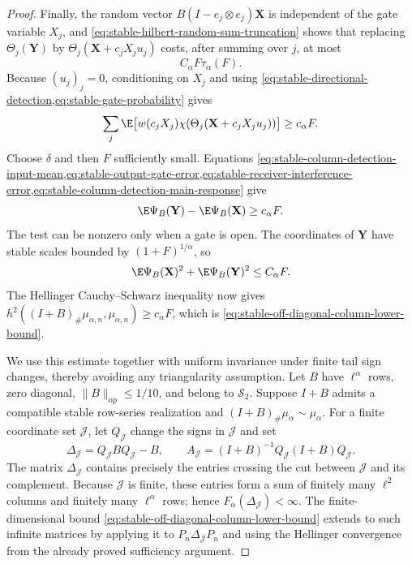\begin{proof}
Finally, the random vector
\(B(I-e_j\otimes e_j)\mathbf X\) is independent of the gate variable \(X_j\),
and \eqref{eq:stable-hilbert-random-sum-truncation} shows that replacing
\(\Theta_j(\mathbf Y)\) by
\(\Theta_j(\mathbf X+c_jX_ju_j)\) costs, after summing over \(j\), at most
\begin{equation}
 C_\alpha F\tau_\alpha(F).
 \label{eq:stable-receiver-interference-error}
\end{equation}
Because \((u_j)_j=0\), conditioning on \(X_j\) and using
\cref{eq:stable-directional-detection,eq:stable-gate-probability} gives
\begin{equation}
 \sum_j\E\bigl[
   w(c_jX_j)\chi(\Theta_j(\mathbf X+c_jX_ju_j))\bigr]
 \ge c_\alpha F.
 \label{eq:stable-column-detection-main-response}
\end{equation}
Choose \(\delta\) and then \(F\) sufficiently small.
Equations
\cref{eq:stable-column-detection-input-mean,eq:stable-output-gate-error,eq:stable-receiver-interference-error,eq:stable-column-detection-main-response}
give
\[
 \E\Psi_B(\mathbf Y)-\E\Psi_B(\mathbf X)\ge c_\alpha F.
\]
The test can be nonzero only when a gate is open.
The coordinates of \(\mathbf Y\) have stable scales bounded by
\((1+F)^{1/\alpha}\), so
\[
 \E\Psi_B(\mathbf X)^2+\E\Psi_B(\mathbf Y)^2\le C_\alpha F.
\]
The Hellinger Cauchy--Schwarz inequality now gives
\(h^2((I+B)_\#\mu_{\alpha,n},\mu_{\alpha,n})\ge c_\alpha F\),
which is \eqref{eq:stable-off-diagonal-column-lower-bound}.

We use this estimate together with uniform invariance under finite tail sign
changes, thereby avoiding any triangularity assumption.
Let \(B\) have \(\ell^\alpha\) rows, zero diagonal,
\(\|B\|_{\mathrm{op}}\le1/10\), and belong to \(\mathcal S_2\).  Suppose
\(I+B\) admits a compatible stable row-series realization and
\((I+B)_\#\mu_\alpha\sim\mu_\alpha\).
For a finite coordinate set \(\mathcal J\), let \(Q_{\mathcal J}\) change
the signs in \(\mathcal J\)
and set
\[
 \Delta_{\mathcal J}=Q_{\mathcal J}BQ_{\mathcal J}-B,
 \qquad
 A_{\mathcal J}=(I+B)^{-1}Q_{\mathcal J}(I+B)Q_{\mathcal J}.
\]
The matrix \(\Delta_{\mathcal J}\) contains precisely the entries crossing
the cut between \(\mathcal J\) and its complement.
Because \(\mathcal J\) is finite, these entries form a sum of finitely many
\(\ell^2\) columns and finitely many \(\ell^\alpha\) rows; hence
\(F_\alpha(\Delta_{\mathcal J})<\infty\).
The finite-dimensional bound
\eqref{eq:stable-off-diagonal-column-lower-bound} extends to such infinite matrices by
applying it to \(P_n\Delta_{\mathcal J}P_n\) and using the Hellinger convergence from
the already proved sufficiency argument.


\end{proof}
